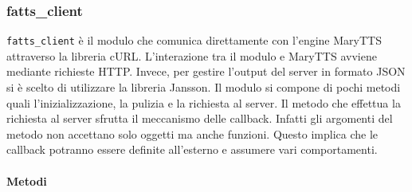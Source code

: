 	\subsubsection{fatts\_client}
	\texttt{fatts\_client} è il modulo che comunica direttamente con l'engine MaryTTS attraverso la libreria cURL. L'interazione tra il modulo e MaryTTS avviene mediante richieste HTTP. Invece, per gestire l'output del server in formato JSON si è scelto di utilizzare la libreria Jansson. 
	Il modulo si compone di pochi metodi quali l'inizializzazione, la pulizia e la richiesta al server.
	Il metodo che effettua la richiesta al server sfrutta il meccanismo delle callback. Infatti gli argomenti del metodo non accettano solo oggetti ma anche funzioni. Questo implica che le callback potranno essere definite all'esterno e assumere vari comportamenti.
	\\\\
	\textbf{Metodi}
